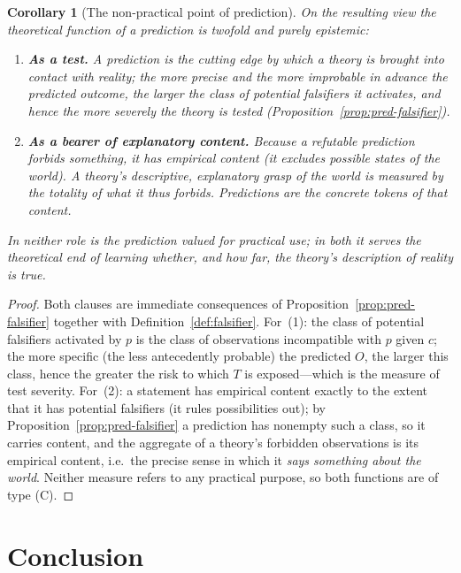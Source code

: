 \documentclass{amsart}
\theoremstyle{definition}
\theoremstyle{plain}
\newtheorem{corollary}{Corollary}
\begin{document}
\begin{corollary}[The non-practical point of prediction]\label{cor:why-predict}
On the resulting view the theoretical function of a prediction is twofold and
purely epistemic:
\begin{enumerate}
\item \textbf{As a test.} A prediction is the cutting edge by which a theory is
brought into contact with reality; the more precise and the more
\emph{improbable in advance} the predicted outcome, the larger the class of
potential falsifiers it activates, and hence the more severely the theory is
tested (Proposition~\ref{prop:pred-falsifier}).
\item \textbf{As a bearer of explanatory content.} Because a refutable
prediction forbids something, it has empirical \emph{content} (it excludes
possible states of the world). A theory's descriptive, explanatory grasp of the
world is measured by the totality of what it thus forbids. Predictions are the
concrete tokens of that content.
\end{enumerate}
In neither role is the prediction valued for practical use; in both it serves
the theoretical end of learning whether, and how far, the theory's description
of reality is true.
\end{corollary}

\begin{proof}
Both clauses are immediate consequences of
Proposition~\ref{prop:pred-falsifier} together with
Definition~\ref{def:falsifier}. For~(1): the class of potential falsifiers
activated by $p$ is the class of observations incompatible with $p$ given $c$;
the more specific (the less antecedently probable) the predicted $O$, the
larger this class, hence the greater the risk to which $T$ is exposed---which is
the measure of test severity. For~(2): a statement has empirical content
exactly to the extent that it has potential falsifiers (it rules possibilities
out); by Proposition~\ref{prop:pred-falsifier} a prediction has nonempty such a
class, so it carries content, and the aggregate of a theory's forbidden
observations is its empirical content, i.e.\ the precise sense in which it
\emph{says something about the world}. Neither measure refers to any practical
purpose, so both functions are of type (C).
\end{proof}

\section{Conclusion}
\end{document}
